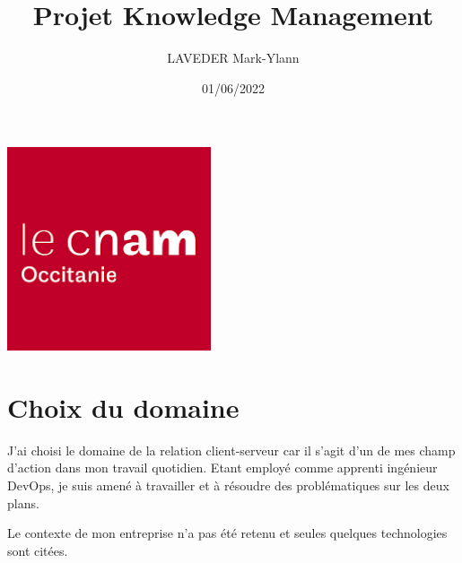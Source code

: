 \documentclass{article}
\title{Projet Knowledge Management}
\author{LAVEDER Mark-Ylann}
\date{01/06/2022}
\begin{document}
\maketitle
\thispagestyle{empty}


\begin{center}
    \includegraphics[width=6cm]{../images/logo.png}
\end{center}
\clearpage

\renewcommand{\contentsname}{Sommaire}
\tableofcontents
\thispagestyle{empty}
\clearpage

\setcounter{page}{1}
\section{Choix du domaine}
J'ai choisi le domaine de la relation client-serveur car il s'agit d'un de mes champ d'action dans mon travail quotidien.
Etant employé comme apprenti ingénieur DevOps, je suis amené à travailler et à résoudre des problématiques sur les deux plans.

\noindent
Le contexte de mon entreprise n'a pas été retenu et seules quelques technologies sont citées.
\end{document}
